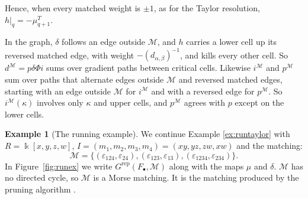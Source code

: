 \documentclass[12pt]{amsart}
\theoremstyle{plain}
\theoremstyle{definition}
\newtheorem{example}[theorem]{Example}
\newcommand{\kk}{\Bbbk}
\newcommand{\F}{ {F_\bullet} }
\newcommand{\M}{\mathcal{M}}
\newcommand{\Grep}{G^{\mathrm{rep}}}
\newcommand{\eps}{\varepsilon}
\begin{document}
Hence, when every matched weight is $\pm 1$, as for the Taylor resolution, $h|_q = -\mu_{q+1}^{T}$.

In the graph, $\delta$ follows an edge outside $\M$, and $h$ carries a lower cell up its reversed matched edge, with weight $-(d_{\alpha,\beta})^{-1}$, and kills every other cell. So $d^{\M} = p \delta \Phi i$ sums over gradient paths between critical cells. Likewise $i^{\M}$ and $p^{\M}$ sum over paths that alternate edges outside $\M$ and reversed matched edges, starting with an edge outside $\M$ for $i^{\M}$ and with a reversed edge for $p^{\M}$. So $i^{\M}(\kappa)$ involves only $\kappa$ and upper cells, and $p^{\M}$ agrees with $p$ except on the lower cells.

\begin{example}[The running example]\label{ex:runSec3}  We continue Example \ref{ex:runtaylor} with $R = \kk[x, y, z, w]$, $I = (m_1, m_2, m_3, m_4) = (xy, yz, zw, xw)$ and the matching: \[
    \M = \bigl\{ (\eps_{124}, \eps_{24}), (\eps_{123}, \eps_{13}), (\eps_{1234}, \eps_{234}) \bigr\}.
\]
In Figure~\ref{fig:runex} we write $\Grep(\F, \M)$ along with the maps $\mu$ and $\delta$. $\M$ has no directed cycle, so $\M$ is a Morse matching. It is the matching produced by the pruning algorithm \cite[Algorithm~3.1]{AlvarezFernandezGimenez}.

\begin{figure}[htbp]
    \centering


\end{figure}
\end{example}
\end{document}
